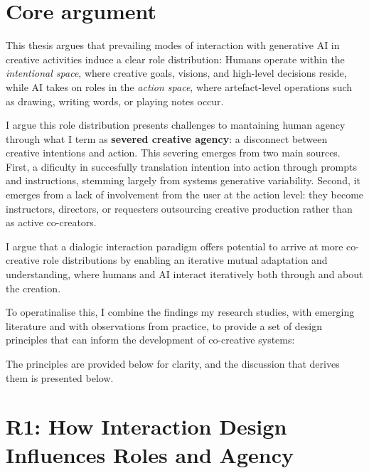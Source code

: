 \section{Core argument}

This thesis argues that prevailing modes of interaction with generative AI in creative activities induce a clear role distribution: Humans operate within the \textit{intentional space}, where creative goals, visions, and high-level decisions reside, while AI takes on roles in the \textit{action space}, where artefact-level operations such as drawing, writing words, or playing notes occur.

I argue this role distribution presents challenges to mantaining human agency through what I term as \textbf{severed creative agency}: a disconnect between creative intentions and action. This severing emerges from two main sources. First, a dificulty in succesfully translation intention into action through prompts and instructions, stemming largely from systems generative variability. Second, it emerges from a lack of involvement from the user at the action level: they become instructors, directors, or requesters outsourcing creative production rather than as active co-creators. 

I argue that a dialogic interaction paradigm offers potential to arrive at more co-creative role distributions by enabling an iterative mutual adaptation and understanding, where humans and AI interact iteratively both through and about the creation. 

To operatinalise this, I combine the findings my research studies, with emerging literature and with observations from practice, to provide a set of design principles that can inform the development of co-creative systems: 

The principles are provided below for clarity, and the discussion that derives them is presented below. 

\section{R1: How Interaction Design Influences Roles and Agency}

